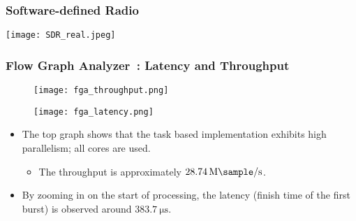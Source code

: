 \begin{frame}
  \end{frame}


  \begin{frame}
    \frametitle{Software-defined Radio}
    \begin{center}
      \texttt{[image: SDR\_real.jpeg]}
    \end{center}

  \end{frame} 


  \begin{frame}
    \frametitle{Flow Graph Analyzer~\cite{Intel_Corporation}: Latency and Throughput}


    \begin{figure}
        \centering
          \texttt{[image: fga\_throughput.png]}
    \end{figure}

    \begin{figure}
      \centering
        \texttt{[image: fga\_latency.png]}
  \end{figure}

    \begin{itemize}
        \item The top graph shows that the task based implementation
          exhibits high parallelism; all cores are used.
          \begin{itemize}
          \item The throughput is approximately
            $ \SI[per-mode=symbol]{28.74}{\mega\sample\per\second}$.
          \end{itemize}
        \item By zooming in on the start of processing, the latency (finish time of the first burst) is observed around $ \SI[per-mode=symbol]{383.7}{\micro\second}$.

    \end{itemize}
  \end{frame}


